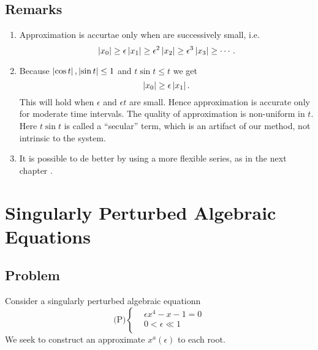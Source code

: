 \documentclass[12pt,twoside]{article}
\begin{document}
\subsection{Remarks}
\begin{enumerate}[(1)]
\item Approximation is accurtae only when are successively small, i.e.
$$\left|{x_0}\right|\ge\epsilon\left|{x_1}\right|\ge\epsilon^2\left|{x_2}\right|\ge\epsilon^3\left|{x_3}\right|\ge\cdots.$$
\item Because $\left|{\cos t}\right|,\left|{\sin t}\right|\le1$ and $t\sin t\le t$ we get
$$\left|{x_0}\right|\ge\epsilon\left|{x_1}\right|.$$ This will hold when $\epsilon$ and $\epsilon
t$ are small. Hence approximation is accurate only for moderate time intervals.
The quality of approximation is non-uniform in $t$. Here $t\sin t$ is called a
``secular'' term, which is an artifact of our method, not intrinsic to the
system.
\item It is possible to de better by using a more flexible series, as in the
  next chapter .
\end{enumerate}

\section{Singularly Perturbed Algebraic Equations}
\subsection{Problem}
Consider a singularly perturbed algebraic equationn
\begin{equation*}\text{(P)} \left\{
  \begin{aligned}
    &\epsilon x^4-x-1=0 \\
    &0<\epsilon\ll1 \\
  \end{aligned} \right.
\end{equation*}
We seek to construct an approximate $x^a(\epsilon)$ to each root.
\end{document}
